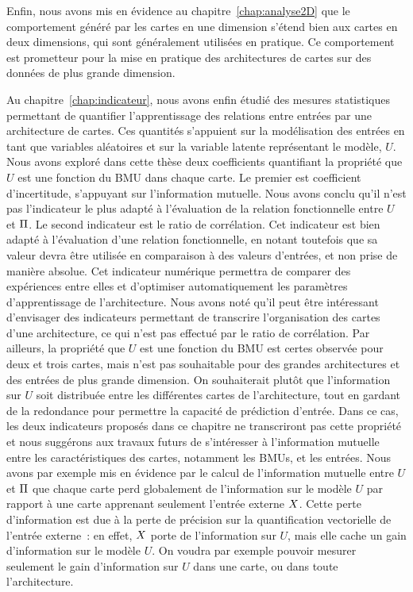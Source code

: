 Enfin, nous avons mis en évidence au chapitre~\ref{chap:analyse2D} que le comportement généré par les cartes en une dimension s'étend bien aux cartes en deux dimensions, qui sont généralement utilisées en pratique. Ce comportement est prometteur pour la mise en pratique des architectures de cartes sur des données de plus grande dimension.

Au chapitre~\ref{chap:indicateur}, nous avons enfin étudié des mesures statistiques permettant de quantifier l'apprentissage des relations entre entrées par une architecture de cartes.
Ces quantités s'appuient sur la modélisation des entrées en tant que variables aléatoires et sur la variable latente représentant le modèle, $U$.
Nous avons exploré dans cette thèse deux coefficients quantifiant la propriété que $U$ est une fonction du BMU dans chaque carte. Le premier est coefficient d'incertitude, s'appuyant sur l'information mutuelle. Nous avons conclu qu'il n'est pas l'indicateur le plus adapté à l'évaluation de la relation fonctionnelle entre $U$ et $\Pi$.
Le second indicateur est le ratio de corrélation. Cet indicateur est bien adapté à l'évaluation d'une relation fonctionnelle, en notant toutefois que sa valeur devra être utilisée en comparaison à des valeurs d'entrées, et non prise de manière absolue. Cet indicateur numérique permettra de comparer des expériences entre elles et d'optimiser automatiquement les paramètres d'apprentissage de l'architecture.
Nous avons noté qu'il peut être intéressant d'envisager des indicateurs permettant de transcrire l'organisation des cartes d'une architecture, ce qui n'est pas effectué par le ratio de corrélation.
Par ailleurs, la propriété que $U$ est une fonction du BMU est certes observée pour deux et trois cartes, mais n'est pas souhaitable pour des grandes architectures et des entrées de plus grande dimension.
On souhaiterait plutôt que l'information sur $U$ soit distribuée entre les différentes cartes de l'architecture, tout en gardant de la redondance pour permettre la capacité de prédiction d'entrée.
Dans ce cas, les deux indicateurs proposés dans ce chapitre ne transcriront pas cette propriété et nous suggérons aux travaux futurs de s'intéresser à l'information mutuelle entre les caractéristiques des cartes, notamment les BMUs, et les entrées. Nous avons par exemple mis en évidence par le calcul de l'information mutuelle entre $U$ et $\Pi$ que chaque carte perd globalement de l'information sur le modèle $U$ par rapport à une carte apprenant seulement l'entrée externe $X$.
Cette perte d'information est due à la perte de précision sur la quantification vectorielle de l'entrée externe~: en effet, $X$ porte de l'information sur $U$, mais elle cache un gain d'information sur le modèle $U$.
On voudra par exemple pouvoir mesurer seulement le gain d'information sur $U$ dans une carte, ou dans toute l'architecture.

